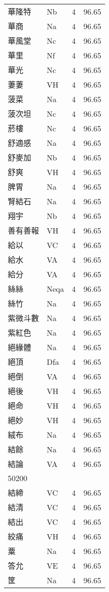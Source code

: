 \documentclass[twocolumn]{book}
\begin{document}
\begin{supertabular}{llrr}
華隆特 & Nb & 4 &  96.65\\
華商 & Na & 4 &  96.65\\
華風堂 & Nc & 4 &  96.65\\
華里 & Nf & 4 &  96.65\\
華光 & Nc & 4 &  96.65\\
萋萋 & VH & 4 &  96.65\\
菠菜 & Na & 4 &  96.65\\
菠次坦 & Nc & 4 &  96.65\\
菸樓 & Nc & 4 &  96.65\\
舒適感 & Na & 4 &  96.65\\
舒麥加 & Nb & 4 &  96.65\\
舒爽 & VH & 4 &  96.65\\
脾胃 & Na & 4 &  96.65\\
腎結石 & Na & 4 &  96.65\\
翔宇 & Nb & 4 &  96.65\\
善有善報 & VH & 4 &  96.65\\
給以 & VC & 4 &  96.65\\
給水 & VA & 4 &  96.65\\
給分 & VA & 4 &  96.65\\
絲絲 & Neqa & 4 &  96.65\\
絲竹 & Na & 4 &  96.65\\
紫微斗數 & Na & 4 &  96.65\\
紫紅色 & Na & 4 &  96.65\\
絕緣體 & Na & 4 &  96.65\\
絕頂 & Dfa & 4 &  96.65\\
絕倒 & VA & 4 &  96.65\\
絕後 & VH & 4 &  96.65\\
絕命 & VH & 4 &  96.65\\
絕妙 & VH & 4 &  96.65\\
絨布 & Na & 4 &  96.65\\
結餘 & Na & 4 &  96.65\\
結論 & VA & 4 &  96.65\\
50200\\
結締 & VC & 4 &  96.65\\
結清 & VC & 4 &  96.65\\
結出 & VC & 4 &  96.65\\
絞痛 & VH & 4 &  96.65\\
粟 & Na & 4 &  96.65\\
答允 & VE & 4 &  96.65\\
筐 & Na & 4 &  96.65\\

\end{supertabular}
\end{document}
